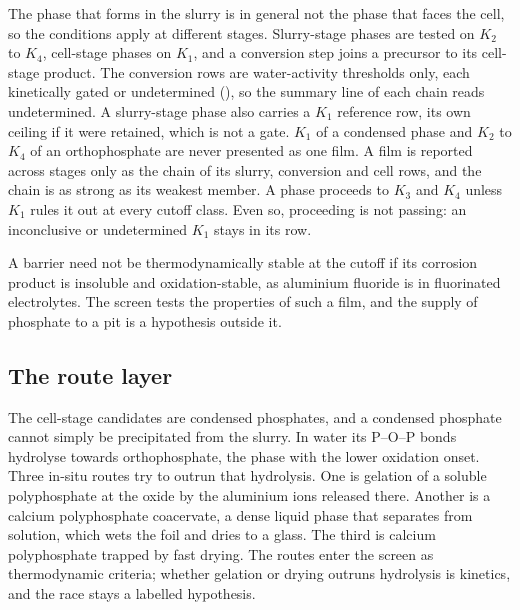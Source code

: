 The phase that forms in the slurry is in general not the phase that faces the cell, so the conditions apply at different stages. %
Slurry-stage phases are tested on $K_2$ to $K_4$, cell-stage phases on $K_1$, and a conversion step joins a precursor to its cell-stage product. %
The conversion rows are water-activity thresholds only, each kinetically gated or undetermined (), so the summary line of each chain reads undetermined. %
A slurry-stage phase also carries a $K_1$ reference row, its own ceiling if it were retained, which is not a gate. %
$K_1$ of a condensed phase and $K_2$ to $K_4$ of an orthophosphate are never presented as one film. %
A film is reported across stages only as the chain of its slurry, conversion and cell rows, and the chain is as strong as its weakest member. %
A phase proceeds to $K_3$ and $K_4$ unless $K_1$ rules it out at every cutoff class. %
Even so, proceeding is not passing: an inconclusive or undetermined $K_1$ stays in its row. %

A barrier need not be thermodynamically stable at the cutoff if its corrosion product is insoluble and oxidation-stable, as aluminium fluoride is in fluorinated electrolytes. %
The screen tests the properties of such a film, and the supply of phosphate to a pit is a hypothesis outside it. %



\subsection{The route layer}\label{sec:routes}

The cell-stage candidates are condensed phosphates, and a condensed phosphate cannot simply be precipitated from the slurry. %
In water its P--O--P bonds hydrolyse towards orthophosphate, the phase with the lower oxidation onset. %
Three in-situ routes try to outrun that hydrolysis. %
One is gelation of a soluble polyphosphate at the oxide by the aluminium ions released there. %
Another is a calcium polyphosphate coacervate, a dense liquid phase that separates from solution\cite{wang2024liquidliquid}, which wets the foil and dries to a glass. %
The third is calcium polyphosphate trapped by fast drying. %
The routes enter the screen as thermodynamic criteria; whether gelation or drying outruns hydrolysis is kinetics, and the race stays a labelled hypothesis. %

